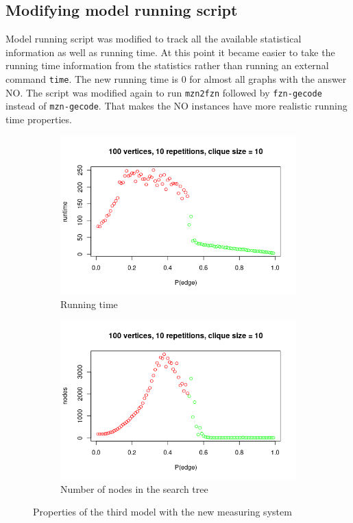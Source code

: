 \documentclass{article}
\begin{document}
\subsection{Modifying model running script}
Model running script was modified to track all the available statistical information as well as running time. At this point it became easier to take the running time information from the statistics rather than running an external command \texttt{time}. The new running time is 0 for almost all graphs with the answer NO. The script was modified again to run \texttt{mzn2fzn} followed by \texttt{fzn-gecode} instead of \texttt{mzn-gecode}. That makes the NO instances have more realistic running time properties.
\begin{figure}
  \begin{subfigure}{.5\textwidth}
    \includegraphics[scale=0.5]{3_runtime.png}
    \caption{Running time}
    \label{fig:3_runtime}
  \end{subfigure}
  \begin{subfigure}{.5\textwidth}
    \includegraphics[scale=0.5]{3_nodes.png}
    \caption{Number of nodes in the search tree}
    \label{fig:3_nodes}
  \end{subfigure}
  \caption{Properties of the third model with the new measuring system}
  \label{fig:3_properties}
\end{figure}
\end{document}
